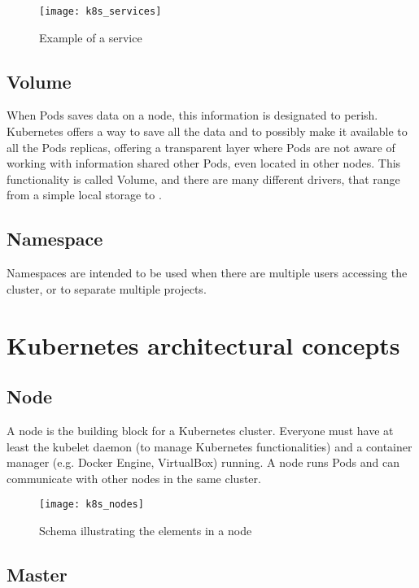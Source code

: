 \begin{figure}[htbp]
\centering
\texttt{[image: k8s\_services]}
\caption{Example of a service}
\end{figure}

\subsection{Volume}
\label{volume}

When Pods saves data on a node, this information is designated to perish.
Kubernetes offers a way to save all the data and to possibly make it available
to all the Pods replicas, offering a transparent layer where Pods are not aware
of working with information shared other Pods, even located in other nodes. This
functionality is called Volume, and there are many different drivers, that range
from a simple local storage to \emph{\gluster{}}.

\subsection{Namespace}
\label{namespace}

Namespaces are intended to be used when there are multiple users accessing the
cluster, or to separate multiple projects.

\section{Kubernetes architectural concepts}
\label{kubernetes-architectural-concepts}

\subsection{Node}\label{node}

A node is the building block for a Kubernetes cluster. Everyone must have
at least the kubelet daemon (to manage Kubernetes functionalities) and a
container manager (e.g. Docker Engine, VirtualBox) running. A node runs Pods
and can communicate with other nodes in the same cluster.

\begin{figure}[htbp]
\centering
\texttt{[image: k8s\_nodes]}
\caption{Schema illustrating the elements in a node}
\end{figure}

\subsection{Master}
\label{master}

